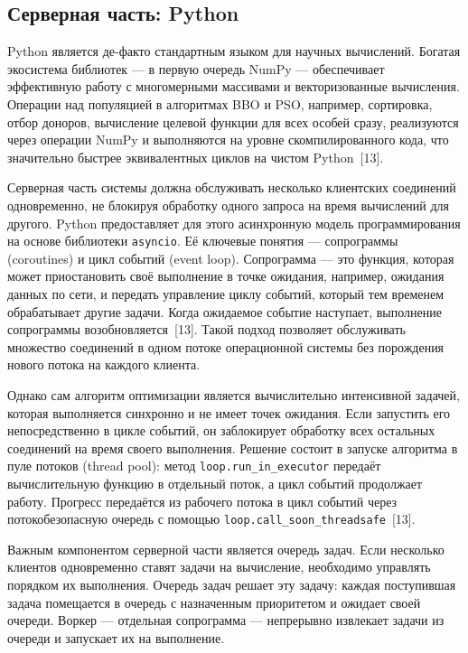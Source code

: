 \documentclass[14pt, russian]{scrartcl}
\begin{document}
\subsection{Серверная часть: Python}

Python является де-факто стандартным языком для научных вычислений.
Богатая экосистема библиотек --- в первую очередь NumPy --- обеспечивает
эффективную работу с многомерными массивами и векторизованные вычисления.
Операции над популяцией в алгоритмах BBO и PSO, например, сортировка, отбор
доноров, вычисление целевой функции для всех особей сразу, реализуются
через операции NumPy и выполняются на уровне скомпилированного кода,
что значительно быстрее эквивалентных циклов на чистом Python~[13].

Серверная часть системы должна обслуживать несколько клиентских
соединений одновременно, не блокируя обработку одного запроса на время
вычислений для другого. Python предоставляет для этого асинхронную
модель программирования на основе библиотеки \texttt{asyncio}. Её
ключевые понятия --- сопрограммы (coroutines) и цикл событий (event
loop). Сопрограмма --- это функция, которая может приостановить своё
выполнение в точке ожидания, например, ожидания данных по сети, и
передать управление циклу событий, который тем временем обрабатывает
другие задачи. Когда ожидаемое событие наступает, выполнение
сопрограммы возобновляется~[13]. Такой подход позволяет обслуживать
множество соединений в одном потоке операционной системы без
порождения нового потока на каждого клиента.

Однако сам алгоритм оптимизации является вычислительно интенсивной
задачей, которая выполняется синхронно и не имеет точек ожидания.
Если запустить его непосредственно в цикле событий, он заблокирует
обработку всех остальных соединений на время своего выполнения.
Решение состоит в запуске алгоритма в пуле потоков (thread pool):
метод \texttt{loop.run\_in\_executor} передаёт вычислительную функцию
в отдельный поток, а цикл событий продолжает работу. Прогресс передаётся
из рабочего потока в цикл событий через потокобезопасную очередь
с помощью \texttt{loop.call\_soon\_threadsafe}~[13].

Важным компонентом серверной части является очередь задач. Если несколько
клиентов одновременно ставят задачи на вычисление, необходимо управлять
порядком их выполнения. Очередь задач решает эту задачу: каждая
поступившая задача помещается в очередь с назначенным приоритетом и
ожидает своей очереди. Воркер --- отдельная сопрограмма --- непрерывно
извлекает задачи из очереди и запускает их на выполнение.
\end{document}
